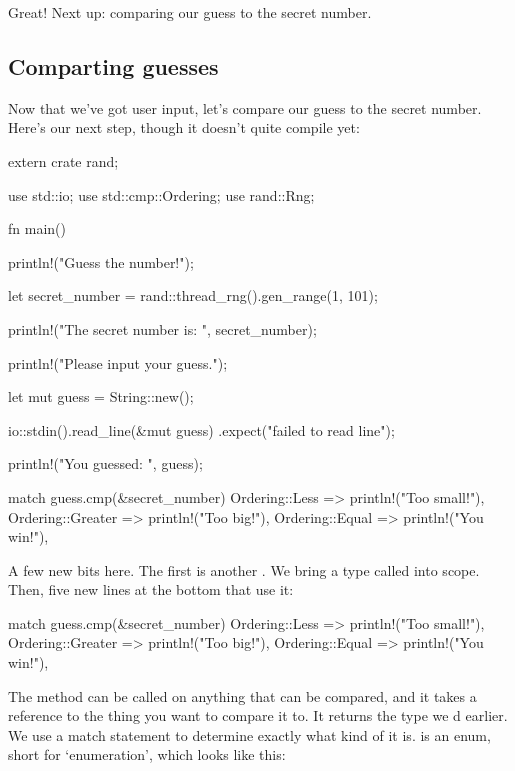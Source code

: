 Great! Next up: comparing our guess to the secret number.

\subsection{Comparting guesses}

Now that we’ve got user input, let’s compare our guess to the secret number. Here’s our next step, though it doesn’t quite 
compile yet:

\begin{rustc}
extern crate rand;

use std::io;
use std::cmp::Ordering;
use rand::Rng;

fn main() {
    println!("Guess the number!");

    let secret_number = rand::thread_rng().gen_range(1, 101);

    println!("The secret number is: {}", secret_number);

    println!("Please input your guess.");

    let mut guess = String::new();

    io::stdin().read_line(&mut guess)
        .expect("failed to read line");

    println!("You guessed: {}", guess);

    match guess.cmp(&secret_number) {
        Ordering::Less    => println!("Too small!"),
        Ordering::Greater => println!("Too big!"),
        Ordering::Equal   => println!("You win!"),
    }
}
\end{rustc}

A few new bits here. The first is another . We bring a type called  into scope. Then, five 
new lines at the bottom that use it:

\begin{rustc}
match guess.cmp(&secret_number) {
    Ordering::Less    => println!("Too small!"),
    Ordering::Greater => println!("Too big!"),
    Ordering::Equal   => println!("You win!"),
}
\end{rustc}

The  method can be called on anything that can be compared, and it takes a reference to the thing you want to compare 
it to. It returns the  type we d earlier. We use a match statement to determine exactly what kind of 
 it is.  is an enum, short for ‘enumeration’, which looks like this:

